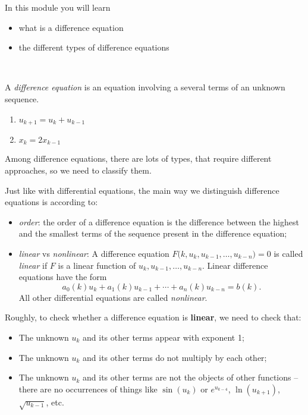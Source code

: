In this module you will learn
\begin{itemize}
	\item what is a difference equation
	\item the different types of difference equations
\end{itemize}

\hfill \\[-10pt]


\begin{definition}
	A \emph{difference equation} is an equation involving a several terms of an unknown sequence.
\end{definition}

\begin{example}
\begin{enumerate}
	\item $u_{k+1} = u_k + u_{k-1}$
	\item $x_k = 2 x_{k-1}$
\end{enumerate}	
\end{example}



Among difference equations, there are lots of types, that require different approaches, so we need to classify them.

\begin{definition}
	Just like with differential equations, the main way we distinguish difference equations is according to:
	\begin{itemize}
		\item \emph{order}: the order of a difference equation is the difference between the highest and the smallest terms of the sequence present in the difference equation;
		\item \emph{linear} vs \emph{nonlinear}: A difference equation \quad $F\big(k,u_k,u_{k-1},\ldots,u_{k-n} \big) = 0$ \quad is called \emph{linear} if $F$ is a linear function of $u_k, u_{k-1}, \ldots,u_{k-n}$. Linear difference equations have the form
			$$ a_0(k) u_k + a_1(k) u_{k-1} + \cdots + a_n(k) u_{k-n} = b(k). $$
			All other differential equations are called \emph{nonlinear}.
	\end{itemize}
\end{definition}

\begin{graybox}
	Roughly, to check whether a difference equation is \textbf{linear}, we need to check that:
	\begin{itemize}
		\item The unknown $u_k$ and its other terms appear with exponent 1;
		\item The unknown $u_k$ and its other terms do not multiply by each other;
		\item The unknown $u_k$ and its other terms are not the objects of other functions -- there are no occurrences of things like $\sin(u_k)$ or $e^{u_{k-4}}$, $\ln(u_{k+1})$, $\sqrt{u_{k-1}}$, etc.
	\end{itemize}
\end{graybox}

